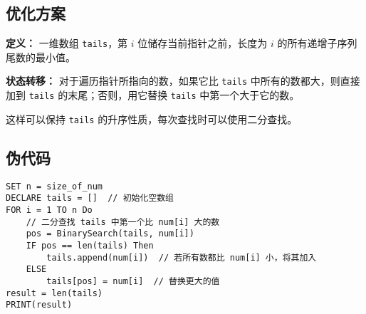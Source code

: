 \documentclass[UTF8]{ctexart}
\begin{document}
\subsection{优化方案}
\noindent \textbf{定义：}  
一维数组 \texttt{tails}，第 $i$ 位储存当前指针之前，长度为 $i$ 的所有递增子序列尾数的最小值。  

\noindent \textbf{状态转移：}  
对于遍历指针所指向的数，如果它比 \texttt{tails} 中所有的数都大，则直接加到 \texttt{tails} 的末尾；否则，用它替换 \texttt{tails} 中第一个大于它的数。  

这样可以保持 \texttt{tails} 的升序性质，每次查找时可以使用二分查找。

\subsection{伪代码}
\begin{lstlisting}[caption={O(NlogN) 解法}]
SET n = size_of_num
DECLARE tails = []  // 初始化空数组
FOR i = 1 TO n Do
    // 二分查找 tails 中第一个比 num[i] 大的数
    pos = BinarySearch(tails, num[i])  
    IF pos == len(tails) Then
        tails.append(num[i])  // 若所有数都比 num[i] 小，将其加入
    ELSE
        tails[pos] = num[i]  // 替换更大的值
result = len(tails)
PRINT(result)
\end{lstlisting}
\end{document}
